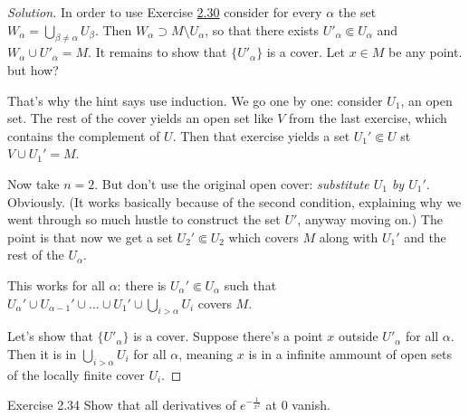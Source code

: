 \begin{proof}[Solution]\leavevmode
In order to use Exercise \hyperref[exer:2.30]{2.30} consider for every \(\alpha\) the set \(W_\alpha=\bigcup_{\beta \neq  \alpha} U_\beta\). Then \(W_\alpha \supset M\setminus U_\alpha\), so that there exists \(U'_\alpha \Subset U_\alpha\) and \(W_\alpha \cup U'_\alpha=M\). It remains to show that \(\{U'_\alpha\}\) is a cover. Let \(x \in M\) be any point. but how?

That's why the hint says use induction. We go one by one: consider \(U_1\), an open set. The rest of the cover yields an open set like  \(V\) from the last exercise, which contains the complement of  \(U\). Then that exercise yields a set  \(U_1' \Subset U\) st \(V \cup  U_1' = M\).

Now take \(n=2\). But don't use the original open cover:  \textit{substitute \(U_1\) by \(U_1'\)}. Obviously. (It works basically because of the second condition, explaining why we went through so much hustle to construct the set \(U'\), anyway moving on.) The point is that now we get a set \(U_2' \Subset U_2\) which covers \(M\) along with \(U_1'\) and the rest of the \(U_\alpha\).

This works for all $\alpha$: there is \(U_\alpha' \Subset U_\alpha\) such that \(U_\alpha' \cup  U_{\alpha-1}' \cup  \ldots \cup U_1' \cup \bigcup_{i>\alpha}U_i\) covers \(M\).

Let's show that \(\{U'_\alpha\}\) is a cover. Suppose there's a point \(x\) outside \(U'_\alpha\) for all \(\alpha\). Then it is in \(\bigcup_{i>\alpha}U_i\) for all \(\alpha\), meaning 
\(x\) is in a infinite ammount of open sets of the locally finite cover \(U_i\).
\end{proof}

\begin{thing4}{Exercise 2.34}\label{exer:2.34}\leavevmode
Show that all derivatives of \(e^{-\frac{1}{x^2}}\) at 0 vanish.
\end{thing4}

